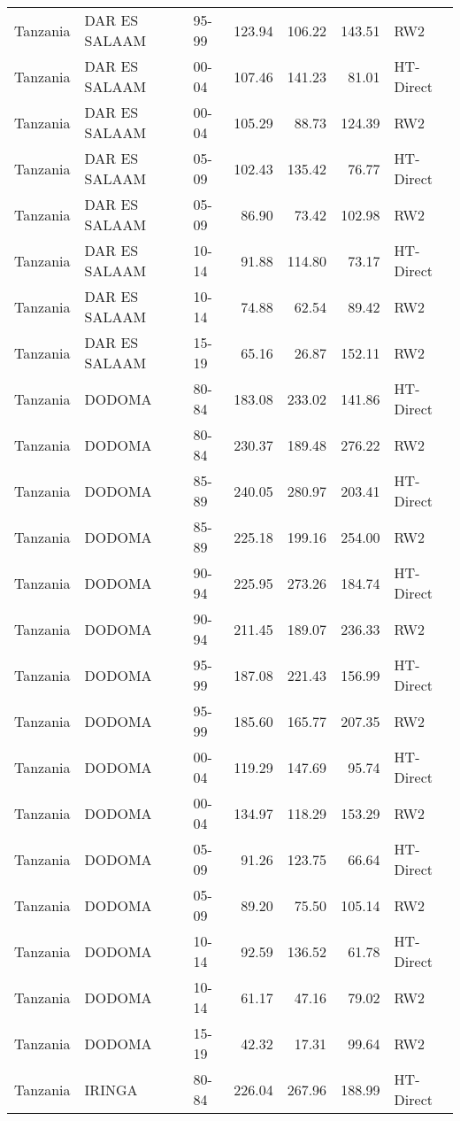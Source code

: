 \begin{longtable}{lllrrrl}
  Tanzania & DAR ES SALAAM & 95-99 & 123.94 & 106.22 & 143.51 & RW2 \\ 
  Tanzania & DAR ES SALAAM & 00-04 & 107.46 & 141.23 & 81.01 & HT-Direct \\ 
  Tanzania & DAR ES SALAAM & 00-04 & 105.29 & 88.73 & 124.39 & RW2 \\ 
  Tanzania & DAR ES SALAAM & 05-09 & 102.43 & 135.42 & 76.77 & HT-Direct \\ 
  Tanzania & DAR ES SALAAM & 05-09 & 86.90 & 73.42 & 102.98 & RW2 \\ 
  Tanzania & DAR ES SALAAM & 10-14 & 91.88 & 114.80 & 73.17 & HT-Direct \\ 
  Tanzania & DAR ES SALAAM & 10-14 & 74.88 & 62.54 & 89.42 & RW2 \\ 
  Tanzania & DAR ES SALAAM & 15-19 & 65.16 & 26.87 & 152.11 & RW2 \\ 
  Tanzania & DODOMA & 80-84 & 183.08 & 233.02 & 141.86 & HT-Direct \\ 
  Tanzania & DODOMA & 80-84 & 230.37 & 189.48 & 276.22 & RW2 \\ 
  Tanzania & DODOMA & 85-89 & 240.05 & 280.97 & 203.41 & HT-Direct \\ 
  Tanzania & DODOMA & 85-89 & 225.18 & 199.16 & 254.00 & RW2 \\ 
  Tanzania & DODOMA & 90-94 & 225.95 & 273.26 & 184.74 & HT-Direct \\ 
  Tanzania & DODOMA & 90-94 & 211.45 & 189.07 & 236.33 & RW2 \\ 
  Tanzania & DODOMA & 95-99 & 187.08 & 221.43 & 156.99 & HT-Direct \\ 
  Tanzania & DODOMA & 95-99 & 185.60 & 165.77 & 207.35 & RW2 \\ 
  Tanzania & DODOMA & 00-04 & 119.29 & 147.69 & 95.74 & HT-Direct \\ 
  Tanzania & DODOMA & 00-04 & 134.97 & 118.29 & 153.29 & RW2 \\ 
  Tanzania & DODOMA & 05-09 & 91.26 & 123.75 & 66.64 & HT-Direct \\ 
  Tanzania & DODOMA & 05-09 & 89.20 & 75.50 & 105.14 & RW2 \\ 
  Tanzania & DODOMA & 10-14 & 92.59 & 136.52 & 61.78 & HT-Direct \\ 
  Tanzania & DODOMA & 10-14 & 61.17 & 47.16 & 79.02 & RW2 \\ 
  Tanzania & DODOMA & 15-19 & 42.32 & 17.31 & 99.64 & RW2 \\ 
  Tanzania & IRINGA & 80-84 & 226.04 & 267.96 & 188.99 & HT-Direct \\ 

\end{longtable}

